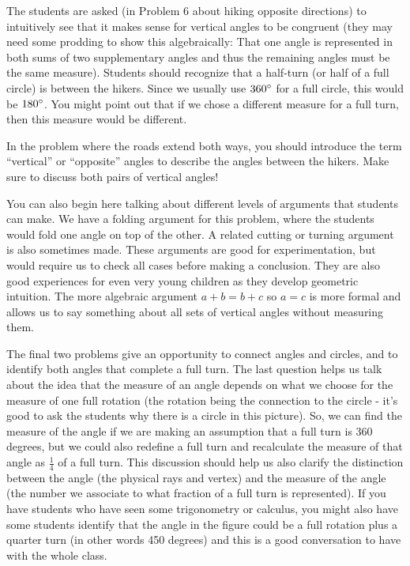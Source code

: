 \documentclass[nooutcomes,noauthor]{ximera}
\begin{document}
\begin{instructorNotes}
 The students are asked (in Problem 6 about hiking opposite directions) to intuitively see that it makes sense for vertical angles to be congruent (they may need some prodding to show this algebraically:  That one angle is represented in both sums of two supplementary angles and thus the remaining angles must be the same measure). Students should recognize that a half-turn (or half of a full circle) is between the hikers.  Since we usually use $360\degree$ for a full circle, this would be $180\degree$.  You might point out that if we chose a different measure for a full turn, then this measure would be different.


In the problem where the roads extend both ways, you should introduce the term ``vertical'' or ``opposite'' angles to describe the angles between the hikers.  Make sure to discuss both pairs of vertical angles!

You can also begin here talking about different levels of arguments that students can make.  We have a folding argument for this problem, where the students would fold one angle on top of the other.  A related cutting or turning argument is also sometimes made.  These arguments are good for experimentation, but would require us to check all cases before making a conclusion.  They are also good experiences for even very young children as they develop geometric intuition.  The more algebraic argument $a+b = b+c$ so $a = c$ is more formal and allows us to say something about all sets of vertical angles without measuring them.

The final two problems give an opportunity to connect angles and circles, and to identify both angles that complete a full turn. The last question helps us talk about the idea that the measure of an angle depends on what we choose for the measure of one full rotation (the rotation being the connection to the circle - it's good to ask the students why there is a circle in this picture). So, we can find the measure of the angle if we are making an assumption that a full turn is $360$ degrees, but we could also redefine a full turn and recalculate the measure of that angle as $\frac{1}{4}$ of a full turn. This discussion should help us also clarify the distinction between the angle (the physical rays and vertex) and the measure of the angle (the number we associate to what fraction of a full turn is represented). If you have students who have seen some trigonometry or calculus, you might also have some students identify that the angle in the figure could be a full rotation plus a quarter turn (in other words 450 degrees) and this is a good conversation to have with the whole class.



\end{instructorNotes}
\end{document}
